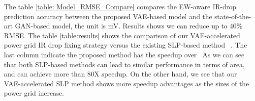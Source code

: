 \begin{table}[h]
	\begin{center} %
		\caption{ Comparison of the proposed VAE-accelerated SLP optimization method against the existing method}
		\label{table:results}
		\center
	\end{center}
	\vspace{-0.1in}
\end{table}
      The table \ref{table: Model_RMSE_Compare}  compares the EW-aware IR-drop prediction accuracy between the proposed VAE-based model and the state-of-the-art GAN-based model, the unit is mV. Results shows we can reduce up to 40\% RMSE. 
      The table \ref{table:results} shows the comparison of our VAE-accelerated power grid IR drop fixing strategy versus the existing SLP-based method~\cite{Sukharev:2019pg} . The last column indicate
      the proposed method has the speedup over~\cite{Sukharev:2019pg}
      As we can see that both SLP-based
      methods can lead to similar performance in terms of area,  and can achieve more than 80X speedup.  On the other hand, we see that our VAE-accelerated SLP method shows more speedup advantages as the sizes of the power grid increase.
      









